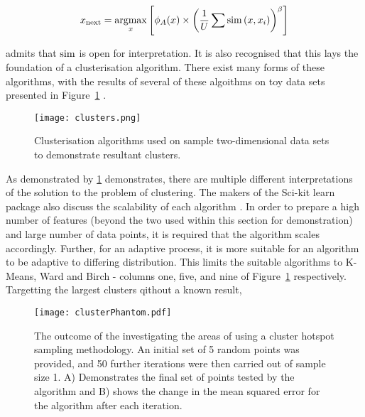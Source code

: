\begin{equation}
  \label{eq:Settles_density}
  x_\mathrm{next}=\operatorname*{argmax}_x{\left[\phi_A(x)\times{\left(\frac{1}{U}\sum{\operatorname*{sim}{(x, x_i)}}\right)}^\beta\right]}
\end{equation}

\textcite{Set08} admits that $\operatorname*{sim}$ is open for interpretation. It is also recognised that this lays the foundation of a clusterisation algorithm. There exist many forms of these algorithms, with the results of several of these algoithms on toy data sets presented in Figure~\ref{fig:ClusterResults} \cite{SciClus}.

\begin{figure}[H]
  \begin{center}
    \texttt{[image: clusters.png]}
    \caption[]{Clusterisation algorithms used on sample two-dimensional data sets to demonstrate resultant clusters.}
    \label{fig:ClusterResults}
  \end{center}
\end{figure}

As demonstrated by \ref{fig:ClusterResults} demonstrates, there are multiple different interpretations of the solution to the problem of clustering. The makers of the Sci-kit learn package also discuss the scalability of each algorithm \cite{SciClus}. In order to prepare a high number of features (beyond the two used within this section for demonstration) and large number of data points, it is required that the algorithm scales accordingly. Further, for an adaptive process, it is more suitable for an algorithm to be adaptive to differing distribution. This limits the suitable algorithms to K-Means, Ward and Birch - columns one, five, and nine of Figure~\ref{fig:ClusterResults} respectively. Targetting the largest clusters qithout a known result,

\begin{figure}[H]
  \begin{center}
    \texttt{[image: clusterPhantom.pdf]}
    \caption[Cluster Hotspot Sampling Illustration]{The outcome of the investigating the areas of using a cluster hotspot sampling methodology. An initial set of 5 random points was provided, and 50 further iterations were then carried out of sample size 1. A) Demonstrates the final set of points tested by the algorithm and B) shows the change in the mean squared error for the algorithm after each iteration.}
    \label{fig:clusterPhantom}
  \end{center}
\end{figure}

